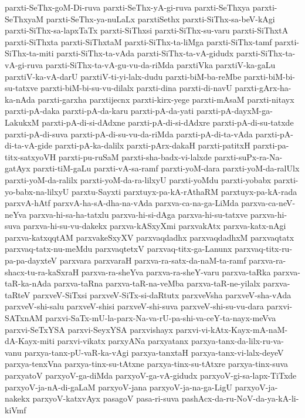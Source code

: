{parxti-SeThx-goM-Di-ruva
parxti-SeThx-yA-gi-ruva
parxti-SeThxya
parxti-SeThxyaM
parxti-SeThx-ya-nuLaLx
parxtiSethx
parxti-SiThx-sa-beV-kAgi
parxti-SiThx-sa-lapxTaTx
parxti-SiThxsi
parxti-SiThx-su-varu
parxti-SiThxtA
parxti-SiThxta
parxti-SiThxtaM
parxti-SiThx-ta-liMga
parxti-SiThx-tamf
parxti-SiThx-ta-miti
parxti-SiThx-ta-vAda
parxti-SiThx-ta-vA-gidudx
parxti-SiThx-ta-vA-gi-ruva
parxti-SiThx-ta-vA-gu-vu-da-riMda
parxtiVka
parxtiV-ka-gaLu
parxtiV-ka-vA-darU
parxtiV-ti-yi-lalx-dudu
parxti-biM-ba-reMbe
parxti-biM-bi-su-tatxve
parxti-biM-bi-su-vu-dilalx
parxti-dina
parxti-di-navU
parxti-gArx-ha-ka-nAda
parxti-garxha
parxtijecnx
parxti-kirx-yege
parxti-mAsaM
parxti-nitayx
parxti-pA-daka
parxti-pA-da-karu
parxti-pA-da-yati
parxti-pA-dayxM-ga-LakukxM
parxti-pA-di-si-dAdxne
parxti-pA-di-si-dAdxre
parxti-pA-di-su-tatxde
parxti-pA-di-suva
parxti-pA-di-su-vu-da-riMda
parxti-pA-di-ta-vAda
parxti-pA-di-ta-vA-gide
parxti-pA-ka-dalilx
parxti-pArx-dakaH
parxti-patitxH
parxti-pa-titx-satxyoVH
parxti-pu-ruSaM
parxti-sha-badx-vi-lalxde
parxti-suPx-ra-Na-gatAyx
parxti-tiM-gaLu
parxti-vA-sa-ramf
parxti-yoM-dara
parxti-yoM-da-ralUlx
parxti-yoM-da-ralilx
parxti-yoM-da-ra-lilxyU
parxti-yoMdu
parxti-yobabx
parxti-yo-babx-na-lilxyU
parxtu-Sayxti
parxtuyx-pa-kA-rAthaRM
parxtuyx-pa-kA-rada
parxvA-hAtf
parxvA-ha-sA-dha-na-vAda
parxva-ca-na-ga-LiMda
parxva-ca-neV-neYva
parxva-hi-sa-ha-tatxlu
parxva-hi-si-dAga
parxva-hi-su-tatxve
parxva-hi-suva
parxva-hi-su-vu-dakekx
parxva-kASxyXmi
parxvakAtx
parxva-katx-nAgi
parxva-katxqqtAM
parxvakeSxyXV
parxvaqdadhx
parxvaqdadhxM
parxvaqtatx
parxvaq-tatx-nu-meMdu
parxvaqtetxV
parxvaq-titx-ga-Lanunx
parxvaq-titx-ru-pa-pa-dayxteV
parxvara
parxvaraH
parxva-ra-satx-da-naM-ta-ramf
parxva-ra-shacx-tu-ra-kaSxraH
parxva-ra-sheYva
parxva-ra-sheY-varu
parxva-taRka
parxva-taR-ka-nAda
parxva-taRna
parxva-taR-na-veMba
parxva-taR-ne-yilalx
parxva-taRteV
parxveV-SiTxsi
parxveV-SiTx-si-daRtutx
parxveVsha
parxveV-sha-vAda
parxveV-shi-salu
parxveV-shisi
parxveV-shi-suva
parxveV-shi-su-vu-dara
parxvi-SATxnAM
parxvi-SaTx-mU-la-parx-Na-va-rU-pa-shi-va-ceY-ta-nayx-meVva
parxvi-SeTxYSA
parxvi-SeyxYSA
parxvishayx
parxvi-vi-kAtx-Kayx-mA-naM-dA-Kayx-miti
parxvi-vikatx
parxyANa
parxyatanx
parxya-tanx-da-lilx-ru-va-vanu
parxya-tanx-pU-vaR-ka-vAgi
parxya-tanxtaH
parxya-tanx-vi-lalx-deyeV
parxya-tenxVna
parxya-tinx-su-tAtxne
parxya-tinx-su-tAtxre
parxya-tinx-suva
parxyatoV
parxyoV-ga-diMda
parxyoV-ga-vA-gidudx
parxyoV-gi-sa-lapx-TiTxde
parxyoV-ja-nA-di-gaLaM
parxyoV-jana
parxyoV-ja-na-ga-LigU
parxyoV-ja-nakekx
parxyoV-katxvAyx
pasagoV
pasa-ri-suva
pashAcx-da-ru-NoV-da-ya-kA-li-kiVmf
}
